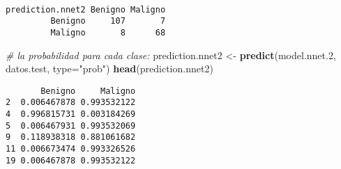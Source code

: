 \documentclass[
]{article}
\newenvironment{Shaded}{\begin{snugshade}}{\end{snugshade}}
\newcommand{\CommentTok}[1]{\textcolor[rgb]{0.56,0.35,0.01}{\textit{#1}}}
\newcommand{\DataTypeTok}[1]{\textcolor[rgb]{0.13,0.29,0.53}{#1}}
\newcommand{\DecValTok}[1]{\textcolor[rgb]{0.00,0.00,0.81}{#1}}
\newcommand{\FloatTok}[1]{\textcolor[rgb]{0.00,0.00,0.81}{#1}}
\newcommand{\KeywordTok}[1]{\textcolor[rgb]{0.13,0.29,0.53}{\textbf{#1}}}
\newcommand{\NormalTok}[1]{#1}
\newcommand{\OperatorTok}[1]{\textcolor[rgb]{0.81,0.36,0.00}{\textbf{#1}}}
\newcommand{\OtherTok}[1]{\textcolor[rgb]{0.56,0.35,0.01}{#1}}
\newcommand{\StringTok}[1]{\textcolor[rgb]{0.31,0.60,0.02}{#1}}
\begin{document}
\begin{Shaded}
\end{Shaded}

\begin{verbatim}
                
prediction.nnet2 Benigno Maligno
         Benigno     107       7
         Maligno       8      68
\end{verbatim}

\begin{Shaded}
\begin{Highlighting}[]
\CommentTok{# la probabilidad para cada clase:}
\NormalTok{prediction.nnet2 <-}\StringTok{ }\KeywordTok{predict}\NormalTok{(model.nnet}\FloatTok{.2}\NormalTok{, datos.test, }\DataTypeTok{type=}\StringTok{"prob"}\NormalTok{)  }
\KeywordTok{head}\NormalTok{(prediction.nnet2)}
\end{Highlighting}
\end{Shaded}

\begin{verbatim}
       Benigno     Maligno
2  0.006467878 0.993532122
4  0.996815731 0.003184269
5  0.006467931 0.993532069
9  0.118938318 0.881061682
11 0.006673474 0.993326526
19 0.006467878 0.993532122
\end{verbatim}
\end{document}
